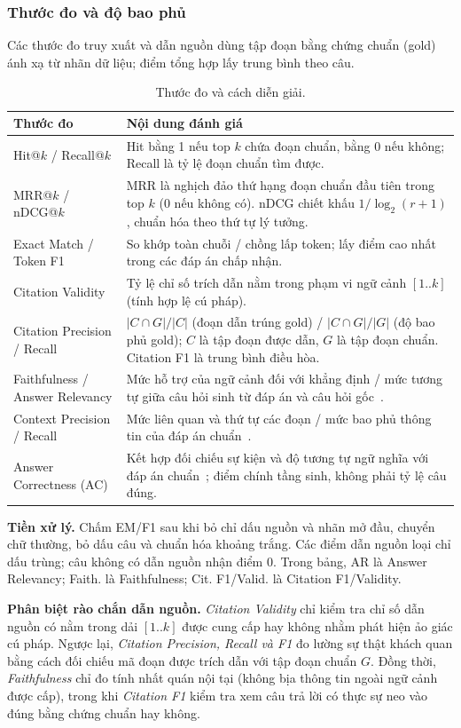 \subsubsection{Thước đo và độ bao phủ}
Các thước đo truy xuất và dẫn nguồn dùng tập đoạn bằng chứng chuẩn (gold) ánh xạ từ nhãn dữ liệu; điểm tổng hợp lấy trung bình theo câu.
\begin{table}[H]\centering\small{}
\caption{Thước đo và cách diễn giải.}\label{tab:metrics}
\begin{tabularx}{\linewidth}{@{}P{4.5cm}Y@{}}\toprule
\textbf{Thước đo} & \textbf{Nội dung đánh giá}\\\midrule
Hit@$k$ / Recall@$k$ & Hit bằng 1 nếu top $k$ chứa đoạn chuẩn, bằng 0 nếu không; Recall là tỷ lệ đoạn chuẩn tìm được. \\
MRR@$k$ / nDCG@$k$ & MRR là nghịch đảo thứ hạng đoạn chuẩn đầu tiên trong top $k$ (0 nếu không có). nDCG chiết khấu $1/\log_2(r+1)$, chuẩn hóa theo thứ tự lý tưởng. \\
Exact Match / Token F1 & So khớp toàn chuỗi / chồng lấp token; lấy điểm cao nhất trong các đáp án chấp nhận. \\
Citation Validity & Tỷ lệ chỉ số trích dẫn nằm trong phạm vi ngữ cảnh $[1..k]$ (tính hợp lệ cú pháp). \\
Citation Precision / Recall & $|C \cap G| / |C|$ (đoạn dẫn trúng gold) / $|C \cap G| / |G|$ (độ bao phủ gold); $C$ là tập đoạn được dẫn, $G$ là tập đoạn chuẩn. Citation F1 là trung bình điều hòa. \\
Faithfulness / Answer Relevancy & Mức hỗ trợ của ngữ cảnh đối với khẳng định / mức tương tự giữa câu hỏi sinh từ đáp án và câu hỏi gốc~\cite{ragas}. \\
Context Precision / Recall & Mức liên quan và thứ tự các đoạn / mức bao phủ thông tin của đáp án chuẩn~\cite{ragas}. \\
Answer Correctness (AC) & Kết hợp đối chiếu sự kiện và độ tương tự ngữ nghĩa với đáp án chuẩn~\cite{ragasdocs}; điểm chính tầng sinh, không phải tỷ lệ câu đúng. \\\bottomrule
\end{tabularx}\end{table}
\textbf{Tiền xử lý.} Chấm EM/F1 sau khi bỏ chỉ dấu nguồn và nhãn mở đầu, chuyển chữ thường, bỏ dấu câu và chuẩn hóa khoảng trắng. Các điểm dẫn nguồn loại chỉ dấu trùng; câu không có dẫn nguồn nhận điểm 0. Trong bảng, AR là Answer Relevancy; Faith. là Faithfulness; Cit. F1/Valid. là Citation F1/Validity.

\textbf{Phân biệt rào chắn dẫn nguồn.} \textit{Citation Validity} chỉ kiểm tra chỉ số dẫn nguồn có nằm trong dải $[1..k]$ được cung cấp hay không nhằm phát hiện ảo giác cú pháp. Ngược lại, \textit{Citation Precision, Recall và F1} đo lường sự thật khách quan bằng cách đối chiếu mã đoạn được trích dẫn với tập đoạn chuẩn $G$. Đồng thời, \textit{Faithfulness} chỉ đo tính nhất quán nội tại (không bịa thông tin ngoài ngữ cảnh được cấp), trong khi \textit{Citation F1} kiểm tra xem câu trả lời có thực sự neo vào đúng bằng chứng chuẩn hay không.

